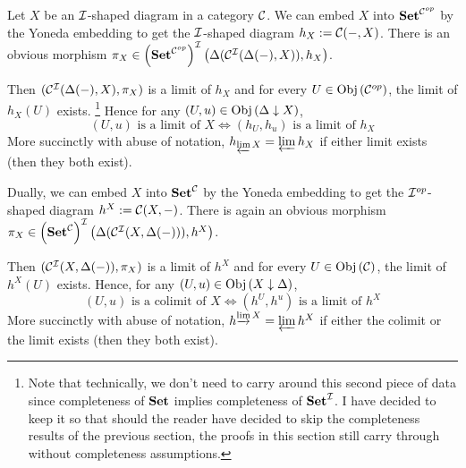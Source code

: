 \begin{prop}
  
  Let $X$ be an $\mathcal{I}$-shaped diagram in a category $\mathcal{C}$.
  We can embed $X$ into $\mathbf{Set}^{\mathcal{C}^{op}}$ by the Yoneda embedding to get 
  the $\mathcal{I}$-shaped diagram $h_X := \mathcal{C}(-,X)$.
  There is an obvious morphism 
  $\pi_X \in \left(\mathbf{Set}^{\mathcal{C}^{op}}\right)^{\mathcal{I}}\left(\Delta(\mathcal{C}^{\mathcal{I}}(\Delta(-),X)),h_X\right)$.

  Then $(\mathcal{C}^{\mathcal{I}}(\Delta(-),X),\pi_X)$ is a limit of $h_X$ and 
  for every $U \in \mathrm{Obj}\left(\mathcal{C}^{op}\right)$, the limit of $h_X(U)$ exists. 
  \footnote{
    Note that technically, 
    we don't need to carry around this second piece of data since 
    completeness of $\mathbf{Set}$ implies completeness of $\mathbf{Set}^{\mathcal{I}}$.
    I have decided to keep it so that should the reader have decided to skip 
    the completeness results of the previous section, 
    the proofs in this section still carry through
    without completeness assumptions.
  }
  Hence for any $(U,u) \in \mathrm{Obj}\left(\Delta\downarrow X\right)$,
  \[
    (U,u) \text{ is a limit of } X \iff 
    (h_U,h_u) \text{ is a limit of } h_X
  \]
  More succinctly with abuse of notation, 
  $h_{\varprojlim X} = \varprojlim h_X$ if either limit exists
  (then they both exist).

  Dually, we can embed $X$ into $\mathbf{Set}^{\mathcal{C}}$ by the Yoneda embedding to get 
  the $\mathcal{I}^{op}$-shaped diagram $h^X := \mathcal{C}(X,-)$.
  There is again an obvious morphism 
  $\pi_X \in \left(\mathbf{Set}^{\mathcal{C}}\right)^{\mathcal{I}}\left(\Delta(\mathcal{C}^{\mathcal{I}}(X,\Delta(-))),h^X\right)$.

  Then $(\mathcal{C}^{\mathcal{I}}(X,\Delta(-)),\pi_X)$ is a limit of $h^X$ and 
  for every $U \in \mathrm{Obj}\left(\mathcal{C}\right)$, the limit of $h^X(U)$ exists. 
  Hence, for any $(U,u) \in \mathrm{Obj}\left(X\downarrow\Delta\right)$,
  \[
    (U,u) \text{ is a colimit of } X \iff 
    (h^U,h^u) \text{ is a limit of } h^X
  \]
  More succinctly with abuse of notation, 
  $h^{\varinjlim X} = \varprojlim h^X$ if 
  either the colimit or the limit exists (then they both exist).

\end{prop}
